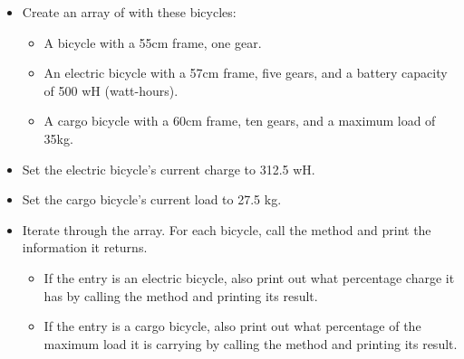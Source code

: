\begin{exercise}
\begin{itemize}
\item Create an array of  with these bicycles:
    \begin{itemize}
    \item A bicycle with a 55cm frame, one gear.
    \item An electric bicycle with a 57cm frame, five gears, and a battery capacity of 500 wH (watt-hours).
    \item A cargo bicycle with a 60cm frame, ten gears, and a maximum load of 35kg.
    \end{itemize}
\item Set the electric bicycle's current charge to 312.5 wH.
\item Set the cargo bicycle's current load to 27.5 kg.
\item Iterate through the array. For each bicycle, call the  method and print the information it returns.
    \begin{itemize}
    \item If the entry is an electric bicycle, also print out what percentage charge it has by calling the  method and printing its result.
    \item If the entry is a cargo bicycle, also print out what percentage of the maximum load it is carrying by calling the  method and printing its result.
    \end{itemize}
\end{itemize}

\end{exercise}

